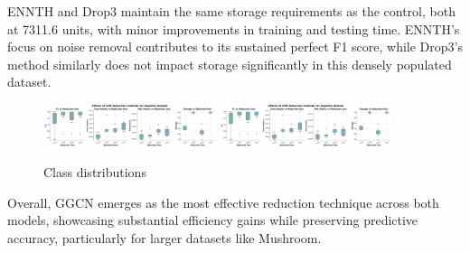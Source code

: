 ENNTH and Drop3 maintain the same storage requirements as the control, both at 7311.6 units, with minor improvements in training and testing time.
ENNTH's focus on noise removal contributes to its sustained perfect F1 score, while Drop3's method similarly does not impact storage significantly in this densely populated dataset.

\begin{figure}
    \centering
    \includegraphics[width=0.45\textwidth]{figures/SVM_reduction_effects_hepatitis.png}
    \includegraphics[width=0.45\textwidth]{figures/SVM_reduction_effects_hepatitis.png}
    \caption{Class distributions}
    \label{fig:SVM-reduction-effects}
\end{figure}

Overall, GGCN emerges as the most effective reduction technique across both models, showcasing substantial efficiency gains while preserving predictive accuracy, particularly for larger datasets like Mushroom.


